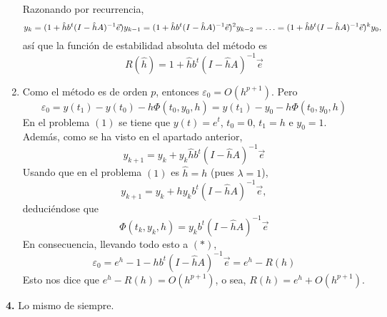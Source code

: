 \documentclass[11pt]{report}
\begin{document}
\begin{enumerate}
Razonando por recurrencia,
\[y_k =(1+\hat{h}b^t(I-\hat{h}A)^{-1}\vec{e})y_{k-1} = (1+\hat{h}b^t(I-\hat{h}A)^{-1}\vec{e})^2y_{k-2} = \mathellipsis = (1+\hat{h}b^t(I-\hat{h}A)^{-1}\vec{e})^ky_0, \]
así que la función de estabilidad absoluta del método es
\[R(\hat{h}) = 1+\hat{h}b^t(I-\hat{h}A)^{-1}\vec{e}\]
\item Como el método es de orden $p$, entonces $\varepsilon_0 = O(h^{p+1})$. Pero
\[\varepsilon_0 = y(t_1)-y(t_0)-h\Phi(t_0,y_0,h) = y(t_1)-y_0-h\Phi(t_0,y_0,h) \tag{$\ast$}\]
En el problema $(1)$ se tiene que $y(t)=e^t$, $t_0 = 0$, $t_1 = h$ e $y_0 = 1$. Además, como se ha visto en el apartado anterior,
\[y_{k+1}=y_k+y_k\hat{h}b^t(I-\hat{h}A)^{-1}\vec{e}\]
Usando que en el problema $(1)$ es $\hat{h} = h$ (pues $\lambda = 1$),
\[y_{k+1}=y_k+hy_kb^t(I-\hat{h}A)^{-1}\vec{e},\]
deduciéndose que
\[\Phi(t_k,y_k,h) = y_kb^t(I-\hat{h}A)^{-1}\vec{e}\]
En consecuencia, llevando todo esto a $(\ast)$,
\[\varepsilon_0 = e^h-1-hb^t(I-\hat{h}A)^{-1}\vec{e} = e^h-R(h)\]
Esto nos dice que $e^h-R(h)=O(h^{p+1})$, o sea, $R(h)=e^h+O(h^{p+1})$.
\end{enumerate}

\textbf{4. } Lo mismo de siempre.
\end{document}
